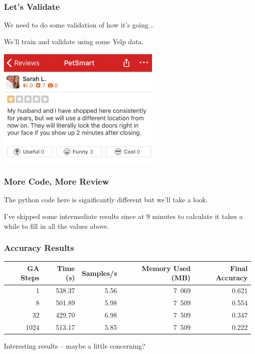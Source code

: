 \begin{frame}
\frametitle{Let's Validate}

We need to do some validation of how it's going...


We'll train and validate using some Yelp data.

\begin{center}
	\includegraphics[width=0.6\textwidth]{images/yelp.png}
\end{center}

\end{frame}

\begin{frame}
\frametitle{More Code, More Review}

The python code here is significantly different but we'll take a look.

I've skipped some intermediate results since at 9 minutes to calculate it takes a while to fill in all the values above.


\end{frame}

\begin{frame}
\frametitle{Accuracy Results}

\begin{center}
\begin{tabular}{r|r|r|r|r}
\textbf{GA Steps} & \textbf{Time (s)} & \textbf{Samples/s} & \textbf{Memory Used (MB)} & \textbf{Final Accuracy}\\ \hline
1 & 538.37 & 5.56 & 7~069 & 0.621 \\
8 & 501.89 & 5.98 & 7~509 & 0.554 \\
32 & 429.70 & 6.98 & 7~509 & 0.347 \\
1024 & 513.17 & 5.85 & 7~509 & 0.222 \\
\end{tabular}
\end{center}

Interesting results -- maybe a little concerning?

\end{frame}

